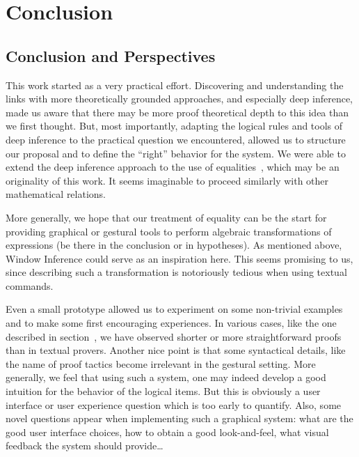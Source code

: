 \setchapterpreamble[u]{\margintoc}
\chapter{Conclusion}



\section{Conclusion and Perspectives}

This work started as a very practical effort. Discovering and
understanding the links with more theoretically grounded approaches,
and especially deep inference, made us aware that there may be more
proof theoretical depth to this idea than we first thought. But, most
importantly, adapting the logical rules and tools of deep inference to
the practical question we encountered, allowed us to structure our
proposal and to define the ``right'' behavior for the system. We were
able to extend the deep inference approach to the use of
equalities~, which may be an originality of this
work. It seems imaginable to proceed similarly with other mathematical
relations. 

More generally, we hope that our treatment of equality can be the
start for providing graphical or gestural tools to perform algebraic
transformations of expressions (be there in the conclusion or in
hypotheses). As mentioned above, Window Inference could serve as an
inspiration here. This seems promising to us, since describing such a
transformation is notoriously tedious when using textual commands.

Even a small prototype allowed us to experiment on some non-trivial
examples and to make some first encouraging experiences. In various
cases, like the one described in section~, we have
observed shorter or more straightforward proofs than in textual
provers. Another nice point is that some syntactical details, like the
name of proof tactics become irrelevant in the gestural setting. More
generally, we feel that using such a system, one may indeed develop a
good intuition for the behavior of the logical items. But this is
obviously a user interface or user experience question which is too
early to quantify. Also, some novel questions appear when implementing
such a graphical system: what are the good user interface choices, how
to obtain a good look-and-feel, what visual feedback the system should
provide\dots

